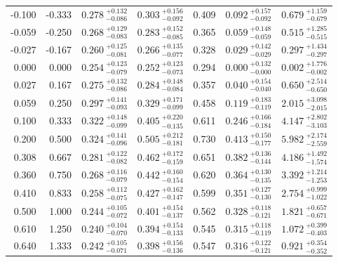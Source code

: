 \begin{table}[h!]
\begin{tabular}{rr|ccc|cc}
    -0.100 & -0.333 & $0.278~_{-0.086}^{+0.132}$ & $0.303~_{-0.092}^{+0.156}$ & 0.409 & $0.092~_{-0.092}^{+0.157}$ & $0.679~_{-0.679}^{+1.159}$ \\
    -0.059 & -0.250 & $0.268~_{-0.083}^{+0.129}$ & $0.283~_{-0.085}^{+0.152}$ & 0.365 & $0.059~_{-0.059}^{+0.148}$ & $0.515~_{-0.515}^{+1.285}$ \\
    -0.027 & -0.167 & $0.260~_{-0.081}^{+0.125}$ & $0.266~_{-0.077}^{+0.135}$ & 0.328 & $0.029~_{-0.029}^{+0.142}$ & $0.297~_{-0.297}^{+1.434}$ \\
    0.000 &  0.000 & $0.254~_{-0.079}^{+0.123}$ & $0.252~_{-0.073}^{+0.123}$ & 0.294 & $0.000~_{-0.000}^{+0.132}$ & $0.002~_{-0.002}^{+1.776}$ \\
    0.027 &  0.167 & $0.275~_{-0.086}^{+0.132}$ & $0.284~_{-0.084}^{+0.148}$ & 0.357 & $0.040~_{-0.040}^{+0.154}$ & $0.650~_{-0.650}^{+2.514}$ \\
    0.059 &  0.250 & $0.297~_{-0.093}^{+0.141}$ & $0.329~_{-0.099}^{+0.171}$ & 0.458 & $0.119~_{-0.119}^{+0.183}$ & $2.015~_{-2.015}^{+3.098}$ \\
    0.100 &  0.333 & $0.322~_{-0.099}^{+0.148}$ & $0.405~_{-0.135}^{+0.220}$ & 0.611 & $0.246~_{-0.184}^{+0.166}$ & $4.147~_{-3.103}^{+2.802}$ \\
    0.200 &  0.500 & $0.324~_{-0.096}^{+0.141}$ & $0.505~_{-0.181}^{+0.212}$ & 0.730 & $0.413~_{-0.177}^{+0.150}$ & $5.982~_{-2.559}^{+2.174}$ \\
    0.308 &  0.667 & $0.281~_{-0.082}^{+0.122}$ & $0.462~_{-0.159}^{+0.172}$ & 0.651 & $0.382~_{-0.144}^{+0.136}$ & $4.186~_{-1.574}^{+1.492}$ \\
    0.360 &  0.750 & $0.268~_{-0.079}^{+0.116}$ & $0.442~_{-0.154}^{+0.160}$ & 0.620 & $0.364~_{-0.135}^{+0.130}$ & $3.392~_{-1.253}^{+1.214}$ \\
    0.410 &  0.833 & $0.258~_{-0.075}^{+0.112}$ & $0.427~_{-0.147}^{+0.162}$ & 0.599 & $0.351~_{-0.130}^{+0.127}$ & $2.754~_{-1.022}^{+0.999}$ \\
    0.500 &  1.000 & $0.244~_{-0.072}^{+0.105}$ & $0.401~_{-0.137}^{+0.154}$ & 0.562 & $0.328~_{-0.121}^{+0.118}$ & $1.821~_{-0.671}^{+0.657}$ \\
    0.610 &  1.250 & $0.240~_{-0.070}^{+0.104}$ & $0.394~_{-0.133}^{+0.154}$ & 0.545 & $0.315~_{-0.119}^{+0.118}$ & $1.072~_{-0.403}^{+0.399}$ \\
    0.640 &  1.333 & $0.242~_{-0.071}^{+0.105}$ & $0.398~_{-0.136}^{+0.156}$ & 0.547 & $0.316~_{-0.121}^{+0.122}$ & $0.921~_{-0.352}^{+0.354}$ \\

\end{tabular}
\end{table}
